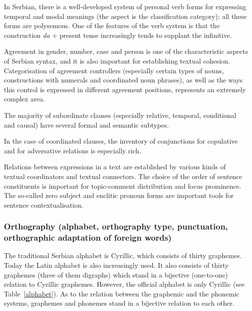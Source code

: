 {\begin{multicols}{2}
In Serbian, there is a well-developed system of personal verb forms for expressing temporal and modal meanings (the aspect is the classification category); all these forms are polysemous. One of the features of the verb system is that the construction \textit{da} + present tense increasingly tends to supplant the infinitive.

Agreement in gender, number, case and person is one of the characteristic aspects of Serbian syntax, and it is also important for establishing textual cohesion. Categorisation of agreement controllers (especially certain types of nouns, constructions with numerals and coordinated noun phrases), as well as the ways this control is expressed in different agreement positions, represents an extremely complex area. 

The majority of subordinate clauses (especially relative, temporal, conditional and causal) have several formal and semantic subtypes.

In the case of coordinated clauses, the inventory of conjunctions for copulative and for adversative relations is especially rich.

Relations between expressions in a text are established by various kinds of textual coordinators and textual connectors. The choice of the order of sentence constituents is important for topic-comment distribution and focus prominence. The so-called zero subject and enclitic pronoun forms are important tools for sentence contextualisation. 

\subsubsection {Orthography (alphabet, orthography type, punctuation, orthographic adaptation of foreign words)}
  
The traditional Serbian alphabet is Cyrillic, which consists of thirty graphemes. Today the Latin alphabet is also increasingly used. It also consists of thirty graphemes (three of them digraphs) which stand in a bijective (one-to-one) relation to Cyrillic graphemes. However, the official alphabet is only Cyrillic (see Table~\ref{alphabet}).
As to the relation between the graphemic and the phonemic systems, graphemes and phonemes stand in a bijective relation to each other. 


\end{multicols}}
